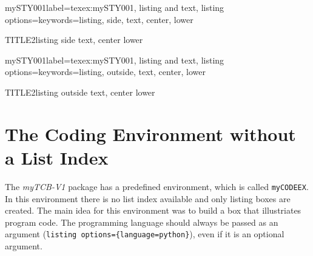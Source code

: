 \documentclass[]{myHOWTO-V001}
\begin{document}
\begin{myTEXEXdoclst}{mySTY001}{label={texex:mySTY001}, listing and text, listing options={keywords={listing, side, text, center, lower}}}
\begin{myTEXEXlst}{TITLE2}{listing side text, center lower}
\end{myTEXEXlst}
\end{myTEXEXdoclst}

\begin{myTEXEXdoclst}{mySTY001}{label={texex:mySTY001}, listing and text, listing options={keywords={listing, outside, text, center, lower}}}
\begin{myTEXEXlst}{TITLE2}{listing outside text, center lower}
\end{myTEXEXlst}
\end{myTEXEXdoclst}

%
%

\section{The Coding Environment without a List Index}

The \emph{myTCB-V1} package has a predefined environment, which is called \Verb|myCODEEX|. In this environment there is no list index available and only listing boxes are created. The main idea for this environment was to build a box that illustriates program code. The programming language should always be passed as an argument (\verb|listing options={language=python}|), even if it is an optional argument.
\end{document}
